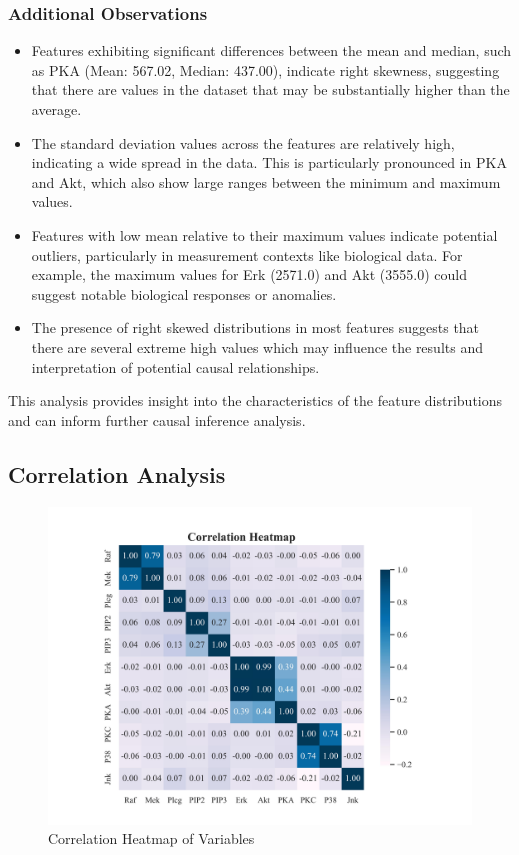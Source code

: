 \documentclass{article}
\begin{document}
\subsubsection{Additional Observations}
\begin{itemize}
\item Features exhibiting significant differences between the mean and median, such as PKA (Mean: 567.02, Median: 437.00), indicate right skewness, suggesting that there are values in the dataset that may be substantially higher than the average.
\item The standard deviation values across the features are relatively high, indicating a wide spread in the data. This is particularly pronounced in PKA and Akt, which also show large ranges between the minimum and maximum values.
\item Features with low mean relative to their maximum values indicate potential outliers, particularly in measurement contexts like biological data. For example, the maximum values for Erk (2571.0) and Akt (3555.0) could suggest notable biological responses or anomalies.
\item The presence of right skewed distributions in most features suggests that there are several extreme high values which may influence the results and interpretation of potential causal relationships. 
\end{itemize}

This analysis provides insight into the characteristics of the feature distributions and can inform further causal inference analysis.

\subsection{Correlation Analysis}

\begin{figure}[H]
\centering
\includegraphics[width=0.8\linewidth]{data/dataset/sachs/output_graph/eda_corr.jpg}
\caption{\label{fig:corr}Correlation Heatmap of Variables}
\end{figure}
\end{document}

